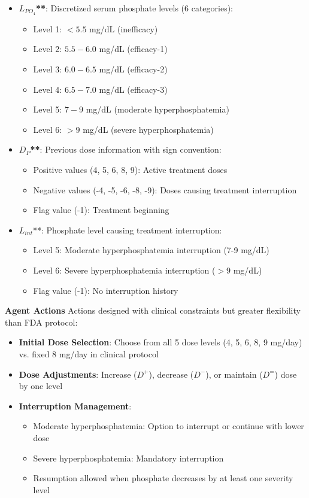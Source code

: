 \begin{itemize}
    \item \textbf{$L_{PO_4}$**}: Discretized serum phosphate levels (6 categories):
    \begin{itemize}
        \item Level 1: $< 5.5$ mg/dL (inefficacy)
        \item Level 2: $5.5-6.0$ mg/dL (efficacy-1)
        \item Level 3: $6.0-6.5$ mg/dL (efficacy-2)
        \item Level 4: $6.5-7.0$ mg/dL (efficacy-3)
        \item Level 5: $7-9$ mg/dL (moderate hyperphosphatemia)
        \item Level 6: $> 9$ mg/dL (severe hyperphosphatemia)
    \end{itemize}
    \item \textbf{$D_P$**}: Previous dose information with sign convention:
    \begin{itemize}
        \item Positive values (4, 5, 6, 8, 9): Active treatment doses
        \item Negative values (-4, -5, -6, -8, -9): Doses causing treatment interruption
        \item Flag value (-1): Treatment beginning
    \end{itemize}
    \item \textbf{$L_{int}$}**: Phosphate level causing treatment interruption:
    \begin{itemize}
        \item Level 5: Moderate hyperphosphatemia interruption (7-9 mg/dL)
        \item Level 6: Severe hyperphosphatemia interruption ($> 9$ mg/dL)
        \item Flag value (-1): No interruption history
    \end{itemize}
\end{itemize}

\textbf{Agent Actions}
Actions designed with clinical constraints but greater flexibility than FDA protocol:
\begin{itemize}
    \item \textbf{Initial Dose Selection}: Choose from all 5 dose levels (4, 5, 6, 8, 9 mg/day) vs. fixed 8 mg/day in clinical protocol
    \item \textbf{Dose Adjustments}: Increase ($D^+$), decrease ($D^-$), or maintain ($D^=$) dose by one level
    \item \textbf{Interruption Management}:
    \begin{itemize}
        \item Moderate hyperphosphatemia: Option to interrupt or continue with lower dose
        \item Severe hyperphosphatemia: Mandatory interruption
        \item Resumption allowed when phosphate decreases by at least one severity level
    \end{itemize}
\end{itemize}

